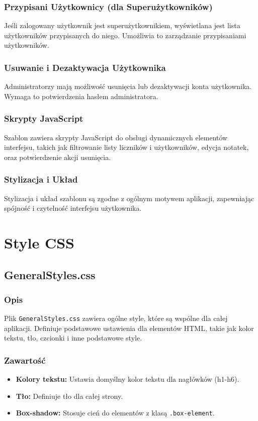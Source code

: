 \documentclass[12pt,a4paper]{report}
\begin{document}
\subsection{Przypisani Użytkownicy (dla Superużytkowników)}
Jeśli zalogowany użytkownik jest superużytkownikiem, wyświetlana jest lista użytkowników przypisanych do niego. Umożliwia to zarządzanie przypisaniami użytkowników.

\subsection{Usuwanie i Dezaktywacja Użytkownika}
Administratorzy mają możliwość usunięcia lub dezaktywacji konta użytkownika. Wymaga to potwierdzenia hasłem administratora.

\subsection{Skrypty JavaScript}
Szablon zawiera skrypty JavaScript do obsługi dynamicznych elementów interfejsu, takich jak filtrowanie listy liczników i użytkowników, edycja notatek, oraz potwierdzenie akcji usunięcia.

\subsection{Stylizacja i Układ}
Stylizacja i układ szablonu są zgodne z ogólnym motywem aplikacji, zapewniając spójność i czytelność interfejsu użytkownika.

\chapter{Style CSS}
\section{GeneralStyles.css}

\subsection{Opis}
Plik \texttt{GeneralStyles.css} zawiera ogólne style, które są wspólne dla całej aplikacji. Definiuje podstawowe ustawienia dla elementów HTML, takie jak kolor tekstu, tło, czcionki i inne podstawowe style.

\subsection{Zawartość}
\begin{itemize}
    \item \textbf{Kolory tekstu:} Ustawia domyślny kolor tekstu dla nagłówków (h1-h6).
    \item \textbf{Tło:} Definiuje tło dla całej strony.
    \item \textbf{Box-shadow:} Stosuje cień do elementów z klasą \texttt{.box-element}.
\end{itemize}
\end{document}
